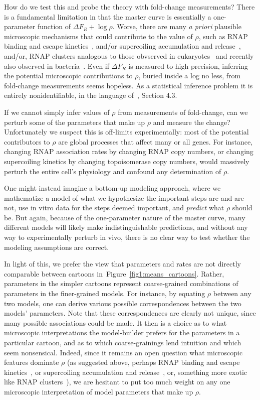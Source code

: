 \documentclass[12pt]{article}%
\newcommand{\fig}[1]{Figure~\ref{#1}}
\begin{document}
How do we test this and probe the theory with fold-change
measurements? There is a fundamental limitation in that the
master curve is essentially a one-parameter function of $\Delta
F_R + \log\rho$. Worse, there are many \textit{a priori}
plausible microscopic mechanisms that could contribute to the
value of $\rho$, such as RNAP binding and escape
kinetics~\cite{DeHaseth1998, Mitarai2015}, and/or supercoiling
accumulation and release~\cite{Chong2014, Sevier2016}, and/or,
RNAP clusters analogous to those obvserved in
eukaryotes~\cite{Cisse2013, Cho2016}
and recently also observed in bacteria~\cite{Ladouceur2020}.
Even if $\Delta F_R$ is measured to
high precision, inferring the potential microscopic contributions
to $\rho$, buried inside a log no less, from fold-change
measurements seems hopeless. As a statistical inference problem
it is entirely nonidentifiable, in the language
of~\cite{Gelman2013}, Section 4.3.

If we cannot simply infer values of $\rho$ from measurements of
fold-change, can we perturb some of the parameters that make up
$\rho$ and measure the change? Unfortunately we suspect this is
off-limits experimentally: most of the potential contributors to
$\rho$ are global processes that affect many or all genes. For
instance, changing RNAP association rates by changing RNAP copy
numbers, or changing supercoiling kinetics by changing
topoisomerase copy numbers, would massively perturb the entire
cell's physiology and confound any determination of $\rho$.

One might instead imagine a bottom-up modeling approach, where we
mathematize a model of what we hypothesize the important steps
are and are not, use in vitro data for the steps deemed
important, and \textit{predict} what $\rho$ should be.
But again, because of the one-parameter nature of the master
curve, many different models will likely make indistinguishable
predictions, and without any way to experimentally perturb in
vivo, there is no clear way to test whether the modeling
assumptions are correct.

In light of this, we prefer the view that parameters and rates
are not directly comparable between cartoons
in~\fig{fig1:means_cartoons}. Rather, parameters in the
simpler cartoons represent coarse-grained combinations of
parameters in the finer-grained models. For instance, by equating
$\rho$ between any two models, one can derive various possible
correspondences between the two models' parameters. Note that
these correspondences are clearly not unique, since many possible
associations could be made. It then is a choice as to what microscopic
interpretations the model-builder prefers for the parameters in a
particular cartoon, and as to which coarse-grainings lend
intuition and which seem nonsensical.
Indeed, since it remains an open question what microscopic
features dominate $\rho$ (as suggested above, perhaps RNAP
binding and escape kinetics~\cite{DeHaseth1998, Mitarai2015}, or
supercoiling accumulation and release~\cite{Chong2014, Sevier2016},
or, something more exotic like
RNAP clusters~\cite{Cisse2013, Cho2016, Ladouceur2020}),
we are hesitant to put too much weight on any one microscopic
interpretation of model parameters that make up $\rho$.
\end{document}
